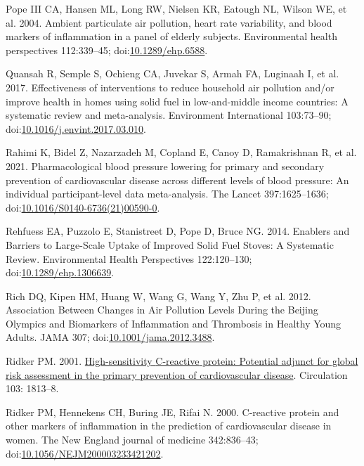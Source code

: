 \documentclass[
  letterpaper,
  DIV=11,
  numbers=noendperiod]{scrartcl}
\newlength{\cslhangindent}
\newenvironment{CSLReferences}[2] %
 {\begin{list}{}{%
  \setlength{\itemindent}{0pt}
  \setlength{\leftmargin}{0pt}
  \setlength{\parsep}{0pt}
  \ifodd #1
   \setlength{\leftmargin}{\cslhangindent}
   \setlength{\itemindent}{-1\cslhangindent}
  \fi
  \setlength{\itemsep}{#2\baselineskip}}}
 {\end{list}}
\begin{document}
\begin{CSLReferences}{1}{1}
Pope III CA, Hansen ML, Long RW, Nielsen KR, Eatough NL, Wilson WE, et
al. 2004. Ambient particulate air pollution, heart rate variability, and
blood markers of inflammation in a panel of elderly subjects.
Environmental health perspectives 112:339--45;
doi:\href{https://doi.org/10.1289/ehp.6588}{10.1289/ehp.6588}.

Quansah R, Semple S, Ochieng CA, Juvekar S, Armah FA, Luginaah I, et al.
2017. Effectiveness of interventions to reduce household air pollution
and/or improve health in homes using solid fuel in low-and-middle income
countries: {A} systematic review and meta-analysis. Environment
International 103:73--90;
doi:\href{https://doi.org/10.1016/j.envint.2017.03.010}{10.1016/j.envint.2017.03.010}.

Rahimi K, Bidel Z, Nazarzadeh M, Copland E, Canoy D, Ramakrishnan R, et
al. 2021. Pharmacological blood pressure lowering for primary and
secondary prevention of cardiovascular disease across different levels
of blood pressure: An individual participant-level data meta-analysis.
The Lancet 397:1625--1636;
doi:\href{https://doi.org/10.1016/S0140-6736(21)00590-0}{10.1016/S0140-6736(21)00590-0}.

Rehfuess EA, Puzzolo E, Stanistreet D, Pope D, Bruce NG. 2014. Enablers
and {Barriers} to {Large-Scale Uptake} of {Improved Solid Fuel Stoves}:
{A Systematic Review}. Environmental Health Perspectives 122:120--130;
doi:\href{https://doi.org/10.1289/ehp.1306639}{10.1289/ehp.1306639}.

Rich DQ, Kipen HM, Huang W, Wang G, Wang Y, Zhu P, et al. 2012.
Association {Between Changes} in {Air Pollution Levels During} the
{Beijing Olympics} and {Biomarkers} of {Inflammation} and {Thrombosis}
in {Healthy Young Adults}. JAMA 307;
doi:\href{https://doi.org/10.1001/jama.2012.3488}{10.1001/jama.2012.3488}.

Ridker PM. 2001.
\href{https://www.ncbi.nlm.nih.gov/pubmed/11282915}{High-sensitivity
{C-reactive} protein: Potential adjunct for global risk assessment in
the primary prevention of cardiovascular disease}. Circulation 103:
1813--8.

Ridker PM, Hennekens CH, Buring JE, Rifai N. 2000. C-reactive protein
and other markers of inflammation in the prediction of cardiovascular
disease in women. The New England journal of medicine 342:836--43;
doi:\href{https://doi.org/10.1056/NEJM200003233421202}{10.1056/NEJM200003233421202}.


\end{CSLReferences}
\end{document}
